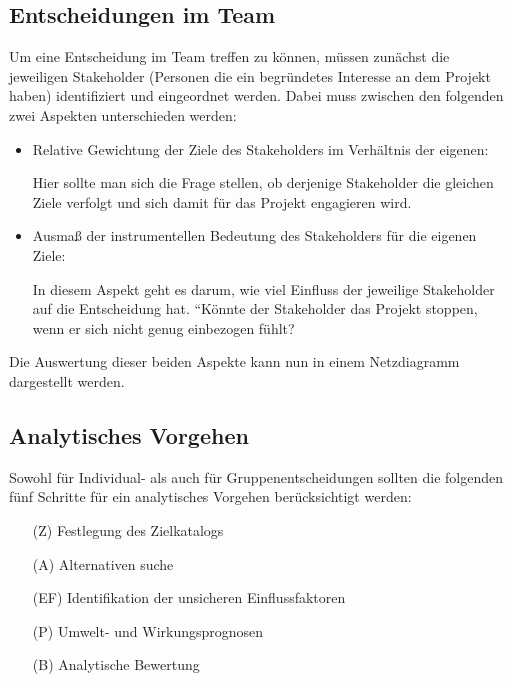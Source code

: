 \documentclass[12pt,a4paper]{scrartcl}
\begin{document}
\subsection{Entscheidungen im Team}
Um eine Entscheidung im Team treffen zu können, müssen zunächst die jeweiligen Stakeholder (Personen die ein begründetes Interesse an dem Projekt haben) identifiziert und eingeordnet werden. Dabei muss zwischen den folgenden zwei Aspekten unterschieden werden:
\begin{itemize}
	\item Relative Gewichtung der Ziele des  Stakeholders im Verhältnis der eigenen:
	
	Hier sollte man sich die Frage stellen, ob derjenige Stakeholder die gleichen Ziele verfolgt und sich damit für das Projekt engagieren wird.
	
	\item Ausmaß der instrumentellen Bedeutung des Stakeholders für die eigenen Ziele:
	
	In diesem Aspekt geht es darum, wie viel Einfluss der jeweilige Stakeholder auf die Entscheidung hat. ``Könnte der Stakeholder das Projekt stoppen, wenn er sich nicht genug einbezogen fühlt?\grqq
\end{itemize}
Die Auswertung dieser beiden Aspekte kann nun in einem Netzdiagramm dargestellt werden.

\subsection{Analytisches Vorgehen \cite{vonNitzsch:211553}}
Sowohl für Individual- als auch für Gruppenentscheidungen sollten die folgenden fünf Schritte für ein analytisches Vorgehen berücksichtigt werden:
\begin{enumerate}
	\item[(Z)] Festlegung des Zielkatalogs
	\item[(A)] Alternativen suche
	\item[(EF)] Identifikation der unsicheren Einflussfaktoren
	\item[(P)] Umwelt- und Wirkungsprognosen
	\item[(B)] Analytische Bewertung
\end{enumerate}
\end{document}
